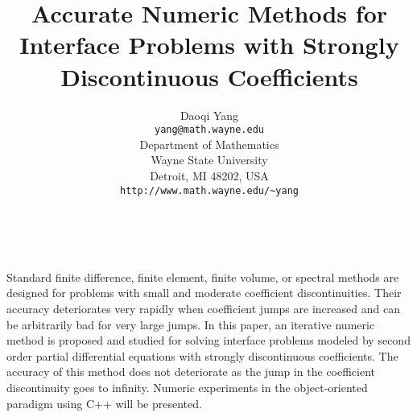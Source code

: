 \documentclass[11pt]{article}
\date{ ~ \hspace{-4mm}}
\title{Accurate Numeric Methods for Interface Problems with  Strongly Discontinuous Coefficients  }
\author{Daoqi Yang \\ {\tt yang@math.wayne.edu} \\ Department of Mathematics \\ Wayne State University \\ Detroit, MI 48202, USA \\ {\tt http://www.math.wayne.edu/\~{}yang}}
\begin{document}
\maketitle
\thispagestyle{empty}






Standard finite difference, finite element,
finite volume, or spectral methods are designed for problems with small and
moderate coefficient discontinuities. Their accuracy deteriorates very
rapidly when coefficient jumps are increased and can be arbitrarily
bad for very large jumps.
In this paper, 
an iterative numeric method is proposed and studied 
for solving interface problems modeled by second order
partial differential equations with strongly discontinuous coefficients.
The accuracy of this method does not deteriorate as the jump in the
coefficient discontinuity goes to infinity.
Numeric experiments in the object-oriented paradigm using C++
will be presented.
\end{document}
